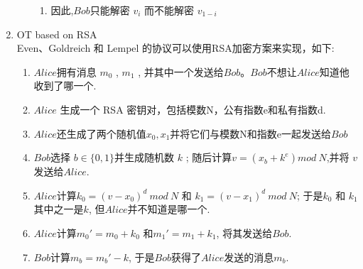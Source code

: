 \begin{enumerate}
\begin{enumerate}
\begin{enumerate}
        \item  因此,$Bob$只能解密 $ v_ {i} $ 而不能解密 $ v_ {1-i} $ \\
        \end{enumerate}
    \end{enumerate}
 \item  OT based on RSA\cite{OTRSA} \\
    Even、Goldreich 和 Lempel 的协议可以使用RSA加密方案来实现，如下:
    \begin{enumerate}
    \item  $Alice$拥有消息 $ m_ {0} $ , $ m_ {1} $ , 并其中一个发送给$Bob$。$Bob$不想让$Alice$知道他收到了哪一个.
    \item  $Alice$ 生成一个 RSA 密钥对，包括模数N，公有指数e和私有指数d.
    \item  $Alice$还生成了两个随机值$x_{0},x_{1}$并将它们与模数N和指数e一起发送给$Bob$
    \item  $Bob$选择 $b\in \{0,1\}$并生成随机数 $k$ ; 随后计算$v = (x_b + k^e) mod~ N$,并将 $v$ 发送给$Alice$.
    \item  $Alice$计算$k_0 = (v - x_0)^d ~mod~N $ 和 $k_1 = (v - x_1)^d ~mod~N $; 于是$k_0$ 和 $k_1$ 其中之一是$k$, 但$Alice$并不知道是哪一个.
    \item  $Alice$计算$m_0' = m_0 + k_0$ 和$m_1' = m_1 + k_1$, 将其发送给$Bob$.
    \item  $Bob$计算$m_b = m_b' - k$, 于是$Bob$获得了$Alice$发送的消息$m_b$.
    \end{enumerate}
\end{enumerate}

\newpage

